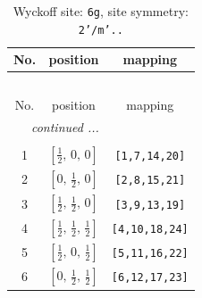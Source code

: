 \documentclass[fleqn,8pt]{jsarticle}
\begin{document}
\renewcommand{\arraystretch}{1.2}
\begin{longtable}{ccc}
\caption{Wyckoff site: {\tt 6g}, site symmetry: {\tt 2'/m'..}}
 \\
 \hline \hline
No. & position & mapping \\ \hline \endfirsthead

\multicolumn{2}{l}{\tablename\ \thetable{}} \\
 \hline \hline
No. & position & mapping \\ \hline \endhead

 \hline \hline
\multicolumn{2}{r}{\footnotesize\it continued ...} \\ \endfoot

 \hline \hline
\multicolumn{2}{r}{} \\ \endlastfoot

1 & $\left[ \frac{1}{2},\, 0,\, 0 \right]$ & {\tt [1,7,14,20]} \\ \hline
2 & $\left[ 0,\, \frac{1}{2},\, 0 \right]$ & {\tt [2,8,15,21]} \\ \hline
3 & $\left[ \frac{1}{2},\, \frac{1}{2},\, 0 \right]$ & {\tt [3,9,13,19]} \\ \hline
4 & $\left[ \frac{1}{2},\, \frac{1}{2},\, \frac{1}{2} \right]$ & {\tt [4,10,18,24]} \\ \hline
5 & $\left[ \frac{1}{2},\, 0,\, \frac{1}{2} \right]$ & {\tt [5,11,16,22]} \\ \hline
6 & $\left[ 0,\, \frac{1}{2},\, \frac{1}{2} \right]$ & {\tt [6,12,17,23]} \\
\end{longtable}
\renewcommand{\arraystretch}{1.2}
\end{document}
